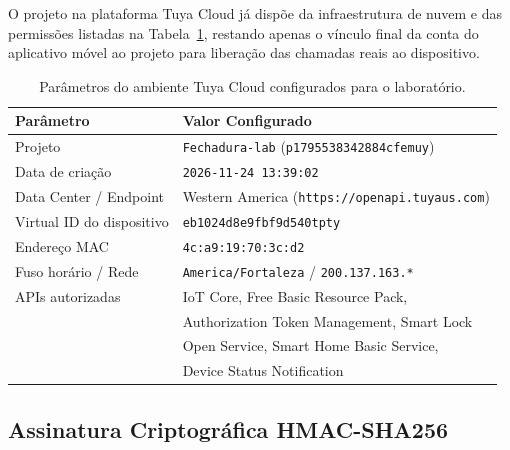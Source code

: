 \documentclass[10pt,twocolumn,a4paper]{article}
\begin{document}
O projeto na plataforma Tuya Cloud j\'a disp\~oe da infraestrutura de nuvem e das permiss\~oes listadas na Tabela~\ref{tab:tuya}, restando apenas o v\'inculo final da conta do aplicativo m\'ovel ao projeto para libera\c{c}\~ao das chamadas reais ao dispositivo.

\begin{table}[t]
\centering
\caption{Par\^ametros do ambiente Tuya Cloud configurados para o laborat\'orio.}
\label{tab:tuya}
\scriptsize
\begin{tabular}{@{}ll@{}}
\toprule
\textbf{Par\^ametro} & \textbf{Valor Configurado} \\
\midrule
Projeto & \texttt{Fechadura-lab} (\texttt{p1795538342884cfemuy}) \\
Data de cria\c{c}\~ao & \texttt{2026-11-24 13:39:02} \\
Data Center / Endpoint & Western America (\texttt{https://openapi.tuyaus.com}) \\
Virtual ID do dispositivo & \texttt{eb1024d8e9fbf9d540tpty} \\
Endere\c{c}o MAC & \texttt{4c:a9:19:70:3c:d2} \\
Fuso hor\'ario / Rede & \texttt{America/Fortaleza} / \texttt{200.137.163.*} \\
APIs autorizadas & IoT Core, Free Basic Resource Pack, \\
& Authorization Token Management, Smart Lock \\
& Open Service, Smart Home Basic Service, \\
& Device Status Notification \\
\bottomrule
\end{tabular}
\end{table}

\subsection{Assinatura Criptogr\'afica HMAC-SHA256}
\end{document}
